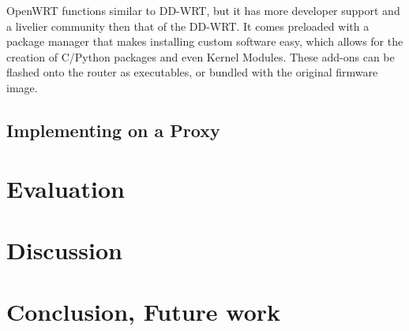 \documentclass[12pt]{article}
\begin{document}
		OpenWRT functions similar to DD-WRT, but it has more developer support and a livelier community then that of the DD-WRT. It comes preloaded with a package manager that makes installing custom software easy, which allows for the creation of C/Python packages and even Kernel Modules. These add-ons can be flashed onto the router as executables, or bundled with the original firmware image. \\


	\subsection{Implementing on a Proxy}


\section{Evaluation}


\section{Discussion}


\section{Conclusion, Future work}


\listoftodos
\end{document}
